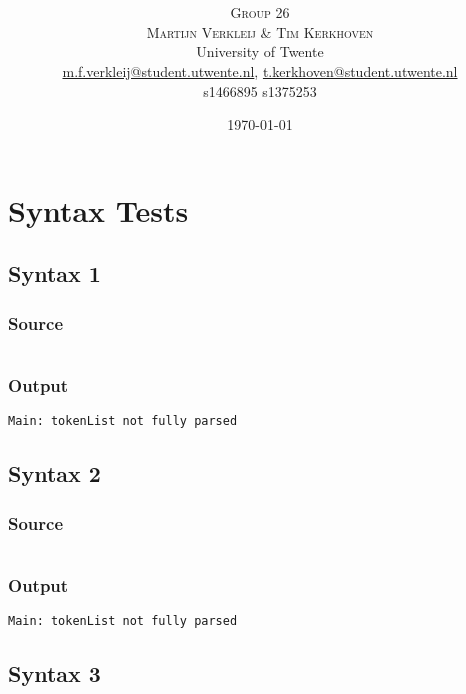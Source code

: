 \documentclass[twoside]{report}
\title{\vspace{-15mm}\fontsize{24pt}{10pt}\selectfont\textbf{\articletitle}} %
\author{
\large
\textsc{Group 26}\\[-0.75mm]
\textsc{Martijn Verkleij \& Tim Kerkhoven}\\[2mm] %
\normalsize University of Twente \\ %
\normalsize \href{mailto:m.f.verkleij@student.utwente.nl}{m.f.verkleij@student.utwente.nl},
\href{mailto:t.kerkhoven@student.utwente.nl}{t.kerkhoven@student.utwente.nl}\\%
\normalsize s1466895 s1375253
}
\date{\today}
\begin{document}
\thispagestyle{empty}
\maketitle %



\tableofcontents


\chapter{Syntax Tests}

\section{Syntax 1}
\subsection{Source}
\inputminted[tabsize=4,linenos,firstnumber=1]{text}{../../src/haskell/PP-project-2016/test/syntax1.shl}
\subsection{Output}
\begin{verbatim}
Main: tokenList not fully parsed
\end{verbatim}

\section{Syntax 2}
\subsection{Source}
\inputminted[tabsize=4,linenos,firstnumber=1]{text}{../../src/haskell/PP-project-2016/test/syntax2.shl}
\subsection{Output}
\begin{verbatim}
Main: tokenList not fully parsed
\end{verbatim}

\section{Syntax 3}
\end{document}
